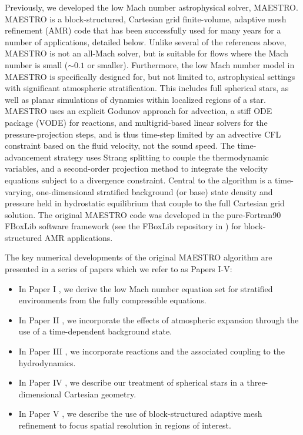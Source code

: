 Previously, we developed the low Mach number astrophysical solver, MAESTRO.
MAESTRO is a block-structured, Cartesian grid finite-volume, adaptive mesh refinement (AMR) code that has been successfully used for many years for a number of applications, detailed below.
Unlike several of the references above, MAESTRO is not an all-Mach solver, but is suitable for flows where the Mach number is small ($\sim 0.1$ or smaller).  
Furthermore, the low Mach number model in MAESTRO is specifically designed for, but not limited to, astrophysical settings with significant atmospheric stratification.
This includes full spherical stars, as well as planar simulations of dynamics within localized regions of a star.
MAESTRO uses an explicit Godunov approach for advection, a stiff ODE package (VODE) \citep{vode} for reactions, and multigrid-based linear solvers for the pressure-projection steps, and is thus time-step limited by an advective CFL constraint based on the fluid velocity, not the sound speed.
The time-advancement strategy uses Strang splitting to couple the thermodynamic variables, and a second-order projection method to integrate the velocity equations subject to a divergence constraint.
Central to the algorithm is a time-varying, one-dimensional stratified background (or base) state density and pressure held in hydrostatic equilibrium that couple to the full Cartesian grid solution.
The original MAESTRO code was developed in the pure-Fortran90 FBoxLib software framework (see the FBoxLib repository in \cite{AMReX}) for block-structured AMR applications.

The key numerical developments of the original MAESTRO algorithm are presented in a series of papers which we refer to as Papers I-V:
\begin{itemize}
\item In Paper I \citep{MAESTRO_I}, we derive the low Mach number equation set for stratified environments from the fully compressible equations.
\item In Paper II \citep{MAESTRO_II}, we incorporate the effects of atmospheric expansion through the use of a time-dependent background state.
\item In Paper III \citep{MAESTRO_III}, we incorporate reactions and the associated coupling to the hydrodynamics.
\item In Paper IV \citep{MAESTRO_IV}, we describe our treatment of spherical stars in a three-dimensional Cartesian geometry.
\item In Paper V \citep{MAESTRO_V}, we describe the use of block-structured adaptive mesh refinement to focus spatial resolution in regions of interest.
\end{itemize}


